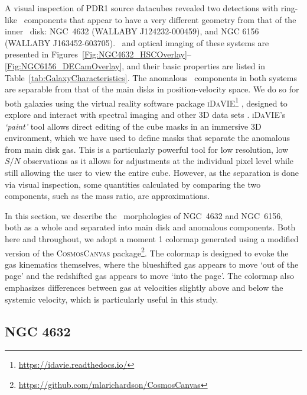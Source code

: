 \documentclass[fleqn,usenatbib]{mnras}
\newcommand{\hi}{\text{H\,\sc{i}}}
\begin{document}
A visual inspection of PDR1 source datacubes revealed two detections with ring-like \hi\ components that appear to have a very different geometry from that of the inner \hi\ disk: NGC~4632 (WALLABY J124232-000459), and NGC 6156 (WALLABY J163452-603705). \hi\ and optical imaging of these systems \textcolor{black}{are} presented in Figures~\ref{Fig:NGC4632_HSCOverlay}--\ref{Fig:NGC6156_DECamOverlay}, and their basic properties are listed in Table~\ref{tab:GalaxyCharacteristics}. The anomalous \hi\ components in both systems are separable from that of the main disks in position-velocity space. We do so for both galaxies using the virtual reality software package \textsc{iDaVIE}\footnote{\href{https://idavie.readthedocs.io/}{https://idavie.readthedocs.io/}} \citep{Comrie2021b}, designed to explore and interact with spectral imaging and other 3D data sets \citep{jarrett+21}. \textsc{iDaVIE}'s \textit{`paint'} tool allows direct editing of the cube masks in an immersive 3D environment, which we have used to define masks that separate the anomalous from main disk gas.  This is a particularly powerful tool for low resolution, low $S/N$ observations as it allows for adjustments at the individual pixel level while still allowing the user to view the entire cube.  However, as the separation is done via visual inspection, some quantities calculated by comparing the two components, such as the mass ratio, are approximations. 

In this section, we describe the \hi\ morphologies of NGC~4632 and NGC~6156, both as a whole and separated into main disk and anomalous components. Both here and throughout, we adopt a moment 1 colormap generated using a modified version of the \textsc{CosmosCanvas} package\footnote{\href{https://github.com/mlarichardson/CosmosCanvas}{https://github.com/mlarichardson/CosmosCanvas}}.  The colormap is designed to evoke the gas kinematics themselves, where the blueshifted gas appears to move `out of the page' and the redshifted gas appears to move `into the page'. The colormap also emphasizes differences between gas at velocities slightly above and below the systemic velocity, which is particularly useful in this study.





\subsection{NGC 4632}
\end{document}
